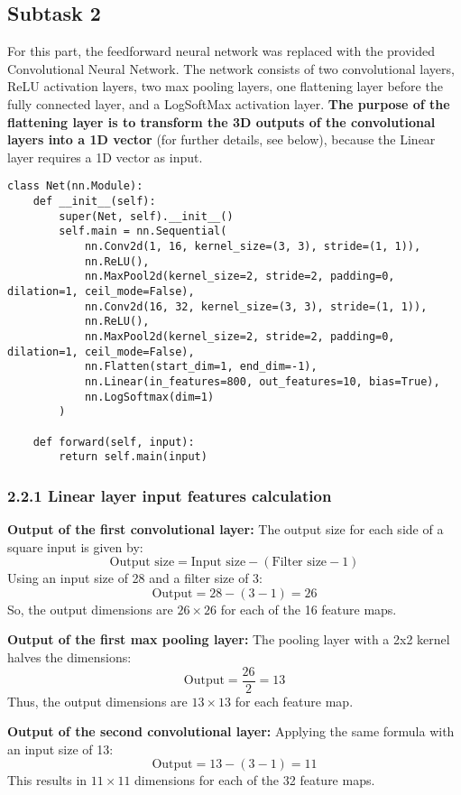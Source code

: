 \subsection*{Subtask 2}
For this part, the feedforward neural network was replaced with the provided Convolutional Neural Network. The network consists of two convolutional layers, ReLU activation layers, two max pooling layers, one flattening layer before the fully connected layer, and a LogSoftMax activation layer. \textbf{The purpose of the flattening layer is to transform the 3D outputs of the convolutional layers into a 1D vector} (for further details, see below), because the Linear layer requires a 1D vector as input.

\begin{lstlisting}
class Net(nn.Module):
    def __init__(self):
        super(Net, self).__init__()
        self.main = nn.Sequential(
            nn.Conv2d(1, 16, kernel_size=(3, 3), stride=(1, 1)),
            nn.ReLU(),
            nn.MaxPool2d(kernel_size=2, stride=2, padding=0, dilation=1, ceil_mode=False),
            nn.Conv2d(16, 32, kernel_size=(3, 3), stride=(1, 1)),
            nn.ReLU(),
            nn.MaxPool2d(kernel_size=2, stride=2, padding=0, dilation=1, ceil_mode=False),
            nn.Flatten(start_dim=1, end_dim=-1),
            nn.Linear(in_features=800, out_features=10, bias=True),
            nn.LogSoftmax(dim=1)
        )

    def forward(self, input):
        return self.main(input)
\end{lstlisting}



\subsubsection*{2.2.1 Linear layer input features calculation}

\textbf{Output of the first convolutional layer:} 
The output size for each side of a square input is given by:
\[ \text{Output size} = \text{Input size} - (\text{Filter size} - 1) \]
Using an input size of 28 and a filter size of 3:
\[ \text{Output} = 28 - (3 - 1) = 26 \]
So, the output dimensions are \(26 \times 26\) for each of the 16 feature maps.

\textbf{Output of the first max pooling layer:} 
The pooling layer with a 2x2 kernel halves the dimensions:
\[ \text{Output} = \frac{26}{2} = 13 \]
Thus, the output dimensions are \(13 \times 13\) for each feature map.

\textbf{Output of the second convolutional layer:} 
Applying the same formula with an input size of 13:
\[ \text{Output} = 13 - (3 - 1) = 11 \]
This results in \(11 \times 11\) dimensions for each of the 32 feature maps.

